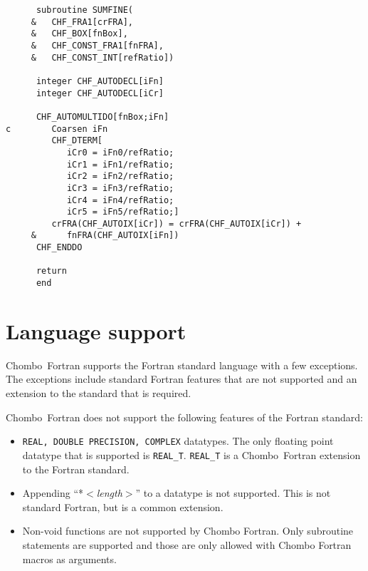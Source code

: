 \begin{small}
\begin{verbatim}
      subroutine SUMFINE(
     &   CHF_FRA1[crFRA],
     &   CHF_BOX[fnBox],
     &   CHF_CONST_FRA1[fnFRA],
     &   CHF_CONST_INT[refRatio])

      integer CHF_AUTODECL[iFn]
      integer CHF_AUTODECL[iCr]

      CHF_AUTOMULTIDO[fnBox;iFn]
c        Coarsen iFn
         CHF_DTERM[
            iCr0 = iFn0/refRatio;
            iCr1 = iFn1/refRatio;
            iCr2 = iFn2/refRatio;
            iCr3 = iFn3/refRatio;
            iCr4 = iFn4/refRatio;
            iCr5 = iFn5/refRatio;]
         crFRA(CHF_AUTOIX[iCr]) = crFRA(CHF_AUTOIX[iCr]) +
     &      fnFRA(CHF_AUTOIX[iFn])
      CHF_ENDDO

      return
      end
\end{verbatim}
\end{small}

\section{Language support}

Chombo\ Fortran supports the Fortran standard language with a few
exceptions.  The exceptions include standard Fortran features that are not
supported and an extension to the standard that is required.  

\noindent Chombo\ Fortran does not support the following features of the
Fortran standard:
\begin{itemize}
\item {\tt REAL, DOUBLE PRECISION, COMPLEX} datatypes.  The only floating point
data\-type that is supported is {\tt REAL\_T}\@.  {\tt REAL\_T} is a Chombo\
Fortran extension to the Fortran standard.
\item  Appending ``*{\em $<$length$>$}'' to a datatype
is not supported.  This is not standard Fortran, but is a common
extension.
\item Non-void functions are not supported by Chombo Fortran.  Only
        subroutine statements are supported and those are only allowed
        with Chombo Fortran macros as arguments.
\end{itemize}

